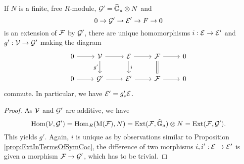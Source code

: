 \documentclass[../main.tex]{subfiles}
\begin{document}
\begin{prop}
  If $N$ is a finite, free $R$-module, $\mathcal{G}' = \widehat{\mathbb{G}}_a \otimes N$ and 
  \begin{equation*}
    0 \to \mathcal{G}' \to \mathcal{E}' \to F \to 0
  \end{equation*}
  is an extension of $\mathcal{F}$ by $\mathcal{G}'$, there are unique homomorphisms
    $i: \mathcal{E} \to \mathcal{E}'$ and $g': \mathcal{V} \to \mathcal{G}'$ making the diagram
  \begin{equation*}
\begin{tikzcd}[ampersand replacement=\&]
	0 \& {\cV} \& \cE \& \cF \& 0 \\
	0 \& {\cG'} \& {\cE'} \& \cF \& 0
	\arrow[from=1-1, to=1-2]
	\arrow[from=1-2, to=1-3]
	\arrow["{g'}"', from=1-2, to=2-2]
	\arrow[from=1-3, to=1-4]
	\arrow["i", from=1-3, to=2-3]
	\arrow[from=1-4, to=1-5]
	\arrow[Rightarrow, no head, from=1-4, to=2-4]
	\arrow[from=2-1, to=2-2]
	\arrow[from=2-2, to=2-3]
	\arrow[from=2-3, to=2-4]
	\arrow[from=2-4, to=2-5]
\end{tikzcd}
  \end{equation*}
  commute. In particular, we have $\mathcal{E}' = g'_* \mathcal{E}$. 
\begin{proof}
  As $\mathcal{V}$ and $\mathcal{G}'$ are additive, we have
  \begin{equation*}
    \operatorname{Hom}(\mathcal{V}, \mathcal{G}') = \operatorname{Hom}_R(\mathrm M(\mathcal{F}), N) = \operatorname{Ext}(\mathcal{F}, \widehat{\mathbb{G}}_a) \otimes N =
    \operatorname{Ext}(\mathcal{F}, \mathcal{G}').
  \end{equation*}
  This yields $g'$. Again, $i$ is unique as by observations similar to 
  Proposition \ref{prop:ExtInTermsOfSymCoc}, the difference of two
  morphisms $i,i':\mathcal{E} \to \mathcal{E}'$ is given a morphism $\mathcal{F} \to \mathcal{G}'$, which has
  to be trivial.
\end{proof}
\end{prop}
\end{document}
